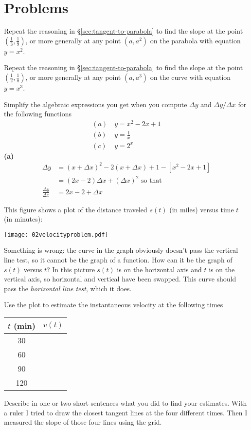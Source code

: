 \section{Problems}
\problemfont%
\begin{multicols}{2}\setlength{\parindent}{0pt}
\problem \label{ex:02derivATonethird}
Repeat the reasoning in \S\ref{sec:tangent-to-parabola} to find the slope at the point
$(\frac13, \frac19)$, or more generally at any point $(a, a^2)$ on the parabola with
equation $y=x^2$.


\problem Repeat the reasoning in \S\ref{sec:tangent-to-parabola} to find the
slope at the point $(\frac12, \frac18)$, or more generally at any point $(a,
a^3)$ on the curve with equation $y=x^3$.

\problem Simplify the algebraic expressions you get when you compute $\Delta y$ and
$\Delta y/\Delta x$ for the following functions
\begin{align*}
  (a)~& y = x^2-2x+1 \\
  (b)~& y = \frac1x \\
  (c)~& y = 2^x
\end{align*}
\answer
\textbf{(a)}
\begin{align*}
  \Delta y &= (x+\Delta x)^2  -2 (x+\Delta x)+1 - [x^2-2x+1]\\
  &=(2x-2)\Delta x +(\Delta x)^2 \text{ so that}\\
  \frac{\Delta y}{\Delta x}&= 2x-2 + \Delta x
\end{align*}
\endanswer


\problem This figure shows a plot of the distance traveled $s(t)$  (in miles) versus time
$t$ (in minutes):

\smallskip

\centerline{\texttt{[image: 02velocityproblem.pdf]}}

\subprob Something is wrong:  the curve in the graph obviously doesn't pass the vertical
line test, so it cannot be the graph of a function. How can it be the graph of $s(t)$
versus $t$?
\answer
In this picture $s(t)$ is on the horizontal axis and $t$ is on the vertical axis, so
horizontal and vertical have been swapped. This curve should pass the \emph{horizontal
line test}, which it does.
\endanswer

\subprob Use the plot to estimate the instantaneous
velocity at the following times
\begin{center}
  \begin{tabular}{cp{1in}}
    \toprule
    $t$ (min) &\hfill $v(t)$ \\[1pt]
    \midrule
    30 & \\[1pt]
    \midrule
    60 & \\[1pt]
    \midrule
    90 & \\[1pt]
    \midrule
    120 & \\
    \bottomrule
  \end{tabular}
\end{center}
Describe in one or two short sentences what you did to find
your estimates.
\answer
With a ruler I tried to draw the closest tangent lines at
the four different times.  Then I measured the slope of those
four lines using the grid.
\endanswer


\end{multicols}
